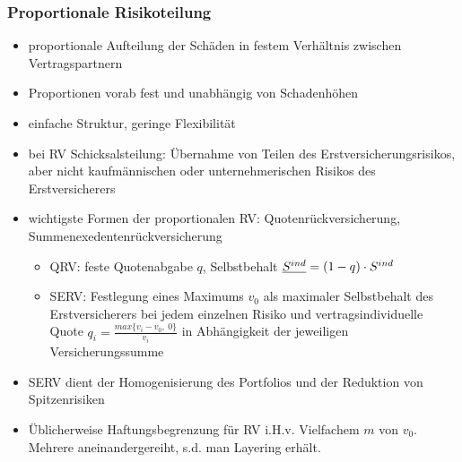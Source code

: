 \documentclass[12pt]{report}
\theoremstyle{dotless}
\theoremstyle{definition}
\begin{document}
\subsubsection{Proportionale Risikoteilung}
\begin{itemize}
	\item proportionale Aufteilung der Schäden in festem Verhältnis zwischen Vertragspartnern
	\item Proportionen vorab fest und unabhängig von Schadenhöhen
	\item einfache Struktur, geringe Flexibilität
	\item bei RV Schicksalsteilung: Übernahme von Teilen des Erstversicherungsrisikos, aber nicht kaufmännischen oder unternehmerischen Risikos des Erstversicherers
	\item wichtigste Formen der proportionalen RV: Quotenrückversicherung, Summenexedentenrückversicherung
		\begin{itemize}
			\item QRV: feste Quotenabgabe $q$, Selbstbehalt $ \underbar{$S^{ind}$} = (1-q) \cdot S^{ind}$
			\item SERV: Festlegung eines Maximums $v_0$ als maximaler Selbstbehalt des Erstversicherers bei jedem einzelnen Risiko und vertragsindividuelle Quote $q_i = \frac{max\{v_i-v_0, \ 0\}}{v_i}$ in Abhängigkeit der jeweiligen Versicherungssumme
		\end{itemize}
	\item SERV dient der Homogenisierung des Portfolios und der Reduktion von Spitzenrisiken
	\item Üblicherweise Haftungsbegrenzung für RV i.H.v. Vielfachem $m$ von $v_0$. Mehrere aneinandergereiht, s.d. man Layering erhält.
\end{itemize}
\end{document}
